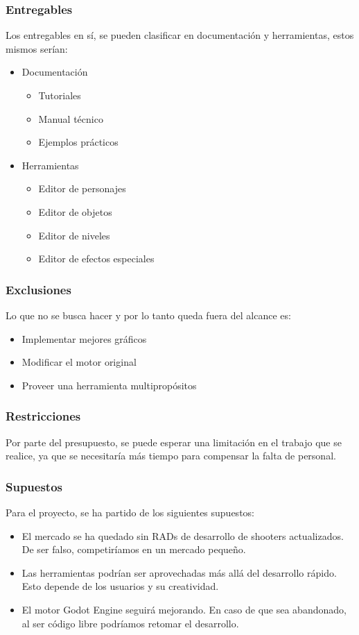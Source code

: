 \documentclass[]{article}
\begin{document}
\subsubsection{Entregables}
Los entregables en s\'i, se pueden clasificar en documentaci\'on y herramientas, estos mismos ser\'ian:
\begin{itemize}
\item Documentaci\'on
\begin{itemize}
	\item Tutoriales
	\item Manual t\'ecnico
	\item Ejemplos pr\'acticos
\end{itemize}
\item Herramientas
\begin{itemize}
	\item Editor de personajes
	\item Editor de objetos
	\item Editor de niveles
	\item Editor de efectos especiales
\end{itemize}
\end{itemize} 
\subsubsection{Exclusiones}
Lo que no se busca hacer y por lo tanto queda fuera del alcance es: 
\begin{itemize}
	\item Implementar mejores gr\'aficos
	\item Modificar el motor original
	\item Proveer una herramienta multiprop\'ositos
\end{itemize}
\subsubsection{Restricciones}
Por parte del presupuesto, se puede esperar una limitaci\'on en el trabajo que se realice, ya que se necesitar\'ia m\'as tiempo para compensar la falta de personal. 
\subsubsection{Supuestos}
Para el proyecto, se ha partido de los siguientes supuestos:
\begin{itemize}
	\item El mercado se ha quedado sin RADs de desarrollo de shooters actualizados. De ser falso, competir\'iamos en un mercado peque\~no.
	\item Las herramientas podr\'ian ser aprovechadas m\'as all\'a del desarrollo r\'apido. Esto depende de los usuarios y su creatividad.
	\item El motor Godot Engine seguir\'a mejorando. En caso de que sea abandonado, al ser c\'odigo libre podr\'iamos retomar el desarrollo. 

\end{itemize}
\end{document}
